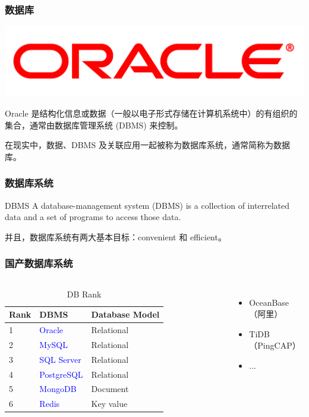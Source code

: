 \documentclass[aspectratio=169, 14pt]{beamer}
\begin{document}
\begin{frame}
	\frametitle{数据库}
	\includegraphics[width=0.5\paperwidth]{image/oracle}
	\begin{exampleblock}{Oracle}
		是结构化信息或数据（一般以电子形式存储在计算机系统中）的有组织的集合，通常由数据库管理系统 (DBMS) 来控制。

		在现实中，数据、DBMS 及关联应用一起被称为\alert{数据库系统}，通常简称为数据库。
	\end{exampleblock}
\end{frame}

\begin{frame}
	\frametitle{数据库系统}
	\begin{block}{DBMS}
		A database-management system (DBMS) is a collection of interrelated data and a set of programs to access those data.
	\end{block}
	并且，数据库系统有两大基本目标：\alert{convenient} 和 \alert{efficient}。
\end{frame}

\begin{frame}
	\frametitle{国产数据库系统}
	\begin{columns}
		\begin{table}
			\caption{DB Rank}
			\begin{tabular}{lll}
				\toprule
				Rank & DBMS                         & Database Model \\
				\midrule
				1    & \textcolor{blue}{Oracle}     & Relational     \\
				2    & \textcolor{blue}{MySQL}      & Relational     \\
				3    & \textcolor{blue}{SQL Server} & Relational     \\
				4    & \textcolor{blue}{PostgreSQL} & Relational     \\
				5    & \textcolor{blue}{MongoDB}    & Document       \\
				6    & \textcolor{blue}{Redis}      & Key value      \\
				\bottomrule
			\end{tabular}
		\end{table}
		\begin{itemize}
			\item OceanBase （阿里）
			\item TiDB （PingCAP）
			\item ...
		\end{itemize}
	\end{columns}

\end{frame}
\end{document}
